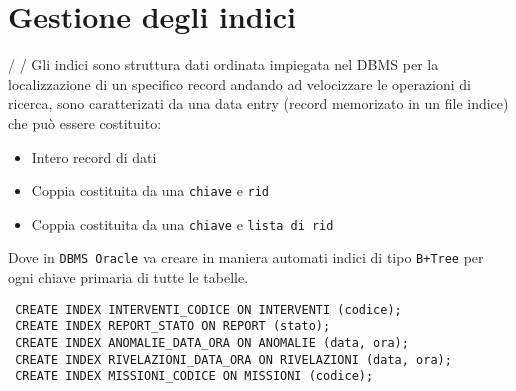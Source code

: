 \section{Gestione degli indici}
/ /
Gli indici sono struttura dati ordinata impiegata nel DBMS per la localizzazione di un specifico record andando ad velocizzare le operazioni di ricerca, sono 
caratterizati da una data entry (record memorizato in un file indice) che può essere costituito:
\begin{itemize}
\item Intero record di dati
\item Coppia costituita da una \texttt{chiave} e \texttt{rid}
\item Coppia costituita da una \texttt{chiave} e \texttt{lista di rid}
\end{itemize}
Dove in \texttt{DBMS Oracle} va creare in maniera automati indici di tipo \texttt{B+Tree} per ogni chiave primaria di tutte le tabelle.
\begin{description}
\begin{verbatim}
 CREATE INDEX INTERVENTI_CODICE ON INTERVENTI (codice);
 CREATE INDEX REPORT_STATO ON REPORT (stato);
 CREATE INDEX ANOMALIE_DATA_ORA ON ANOMALIE (data, ora);
 CREATE INDEX RIVELAZIONI_DATA_ORA ON RIVELAZIONI (data, ora);
 CREATE INDEX MISSIONI_CODICE ON MISSIONI (codice);
\end{verbatim}
\end{description}

